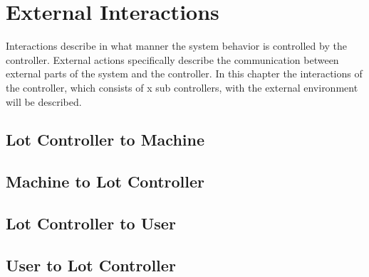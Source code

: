 \section{External Interactions}
Interactions describe in what manner the system behavior is controlled by the controller.
External actions specifically describe the communication between external parts of the system and the controller.
In this chapter the interactions of the controller, which consists of x sub controllers, with the external environment will be described.

\subsection{Lot Controller to Machine}

\subsection{Machine to Lot Controller}

\subsection{Lot Controller to User}

\subsection{User to Lot Controller}
